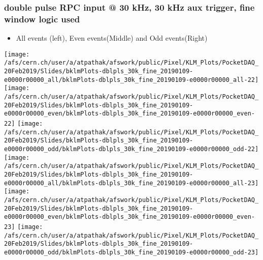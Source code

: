 \documentclass{beamer}
\begin{document}
\begin{frame}
\frametitle{\small double pulse RPC input @ 30 kHz, 30 kHz aux trigger, fine window logic used}
\vspace*{.05cm}
\begin{center}
 \begin{itemize}
\item { \small All events (left), Even events(Middle) and Odd events(Right)}
\end{itemize}
\begin{normalsize}

\vspace*{-.2cm}
\begin{center}

\texttt{[image: /afs/cern.ch/user/a/atpathak/afswork/public/Pixel/KLM\_Plots/PocketDAQ\_20Feb2019/Slides/bklmPlots-dblpls\_30k\_fine\_20190109-e0000r00000\_all/bklmPlots-dblpls\_30k\_fine\_20190109-e0000r00000\_all-22]}
\texttt{[image: /afs/cern.ch/user/a/atpathak/afswork/public/Pixel/KLM\_Plots/PocketDAQ\_20Feb2019/Slides/bklmPlots-dblpls\_30k\_fine\_20190109-e0000r00000\_even/bklmPlots-dblpls\_30k\_fine\_20190109-e0000r00000\_even-22]}
\texttt{[image: /afs/cern.ch/user/a/atpathak/afswork/public/Pixel/KLM\_Plots/PocketDAQ\_20Feb2019/Slides/bklmPlots-dblpls\_30k\_fine\_20190109-e0000r00000\_odd/bklmPlots-dblpls\_30k\_fine\_20190109-e0000r00000\_odd-22]} \\

\texttt{[image: /afs/cern.ch/user/a/atpathak/afswork/public/Pixel/KLM\_Plots/PocketDAQ\_20Feb2019/Slides/bklmPlots-dblpls\_30k\_fine\_20190109-e0000r00000\_all/bklmPlots-dblpls\_30k\_fine\_20190109-e0000r00000\_all-23]}
\texttt{[image: /afs/cern.ch/user/a/atpathak/afswork/public/Pixel/KLM\_Plots/PocketDAQ\_20Feb2019/Slides/bklmPlots-dblpls\_30k\_fine\_20190109-e0000r00000\_even/bklmPlots-dblpls\_30k\_fine\_20190109-e0000r00000\_even-23]}
\texttt{[image: /afs/cern.ch/user/a/atpathak/afswork/public/Pixel/KLM\_Plots/PocketDAQ\_20Feb2019/Slides/bklmPlots-dblpls\_30k\_fine\_20190109-e0000r00000\_odd/bklmPlots-dblpls\_30k\_fine\_20190109-e0000r00000\_odd-23]} \\

\end{center}
\end{normalsize}
\end{center}
\end{frame}
\end{document}
